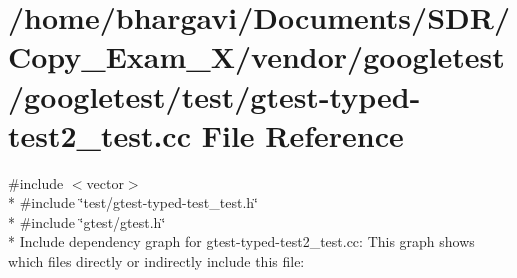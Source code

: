 \hypertarget{gtest-typed-test2__test_8cc}{}\section{/home/bhargavi/\+Documents/\+S\+D\+R/\+Copy\+\_\+\+Exam\+\_\+X/vendor/googletest/googletest/test/gtest-\/typed-\/test2\+\_\+test.cc File Reference}
\label{gtest-typed-test2__test_8cc}
{\ttfamily \#include $<$vector$>$}\\*
{\ttfamily \#include \char`\"{}test/gtest-\/typed-\/test\+\_\+test.\+h\char`\"{}}\\*
{\ttfamily \#include \char`\"{}gtest/gtest.\+h\char`\"{}}\\*
Include dependency graph for gtest-\/typed-\/test2\+\_\+test.cc\+:
This graph shows which files directly or indirectly include this file\+:
